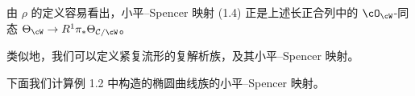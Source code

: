 由 $\rho$ 的定义容易看出，小平–Spencer 映射 (1.4) 正是上述长正合列中的 $\cO_\cW$-同态 $\Theta_\cW\to R^1\pi_*\Theta_{\mathcal{C}/\cW}$。

\begin{remark}[1.3]
类似地，我们可以定义紧复流形的复解析族，及其小平–Spencer 映射。
\end{remark}

下面我们计算例 1.2 中构造的椭圆曲线族的小平–Spencer 映射。


